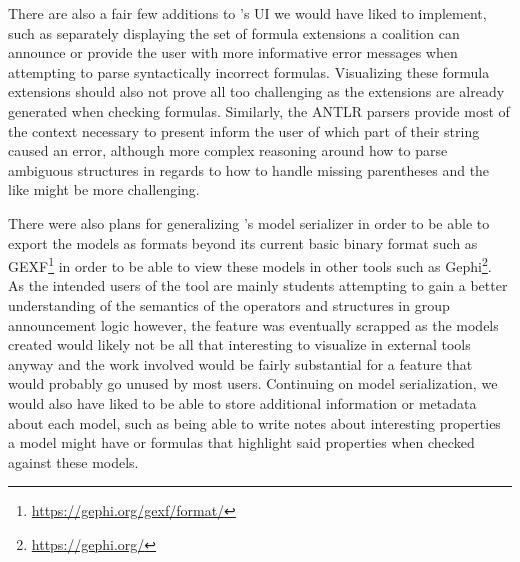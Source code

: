 There are also a fair few additions to \cname's UI we would have liked to implement, such as separately displaying the set of formula extensions a coalition can announce or provide the user with more informative error messages when attempting to parse syntactically incorrect formulas. Visualizing these formula extensions should also not prove all too challenging as the extensions are already generated when checking formulas. Similarly, the ANTLR parsers provide most of the context necessary to present inform the user of which part of their string caused an error, although more complex reasoning around how to parse ambiguous structures in regards to how to handle missing parentheses and the like might be more challenging. 

There were also plans for generalizing \cname{}'s model serializer in order to be able to export the models as formats beyond its current basic binary format such as GEXF\footnote{\url{https://gephi.org/gexf/format/}} in order to be able to view these models in other tools such as Gephi\footnote{\url{https://gephi.org/}}. As the intended users of the tool are mainly students attempting to gain a better understanding of the semantics of the operators and structures in group announcement logic however, the feature was eventually scrapped as the models created would likely not be all that interesting to visualize in external tools anyway and the work involved would be fairly substantial for a feature that would probably go unused by most users.  Continuing on model serialization, we would also have liked to be able to store additional information or metadata about each model, such as being able to write notes about interesting properties a model might have or formulas that highlight said properties when checked against these models. 